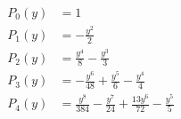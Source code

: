\begin{align*}
P_{0}(y)&=1\\
P_{1}(y)&=- \frac{y^{2}}{2}\\
P_{2}(y)&=\frac{y^{4}}{8} - \frac{y^{3}}{3}\\
P_{3}(y)&=- \frac{y^{6}}{48} + \frac{y^{5}}{6} - \frac{y^{4}}{4}\\
P_{4}(y)&=\frac{y^{8}}{384} - \frac{y^{7}}{24} + \frac{13 y^{6}}{72} - \frac{y^{5}}{5}
\end{align*}
